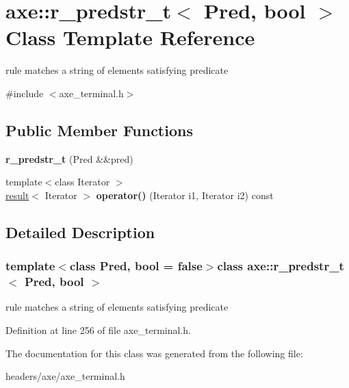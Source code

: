\hypertarget{classaxe_1_1r__predstr__t}{\section{axe\+:\+:r\+\_\+predstr\+\_\+t$<$ Pred, bool $>$ Class Template Reference}
\label{classaxe_1_1r__predstr__t}
}


rule matches a string of elements satisfying predicate  




{\ttfamily \#include $<$axe\+\_\+terminal.\+h$>$}

\subsection*{Public Member Functions}
\begin{DoxyCompactItemize}
\item 
\hypertarget{classaxe_1_1r__predstr__t_a63c2459811a2220a34d5dd04aee536f5}{{\bfseries r\+\_\+predstr\+\_\+t} (Pred \&\&pred)}\label{classaxe_1_1r__predstr__t_a63c2459811a2220a34d5dd04aee536f5}

\item 
\hypertarget{classaxe_1_1r__predstr__t_aadf46b167e3979075f084e4a638e03cf}{{\footnotesize template$<$class Iterator $>$ }\\\hyperlink{structaxe_1_1result}{result}$<$ Iterator $>$ {\bfseries operator()} (Iterator i1, Iterator i2) const }\label{classaxe_1_1r__predstr__t_aadf46b167e3979075f084e4a638e03cf}

\end{DoxyCompactItemize}


\subsection{Detailed Description}
\subsubsection*{template$<$class Pred, bool = false$>$class axe\+::r\+\_\+predstr\+\_\+t$<$ Pred, bool $>$}

rule matches a string of elements satisfying predicate 

Definition at line 256 of file axe\+\_\+terminal.\+h.



The documentation for this class was generated from the following file\+:\begin{DoxyCompactItemize}
\item 
headers/axe/axe\+\_\+terminal.\+h\end{DoxyCompactItemize}
